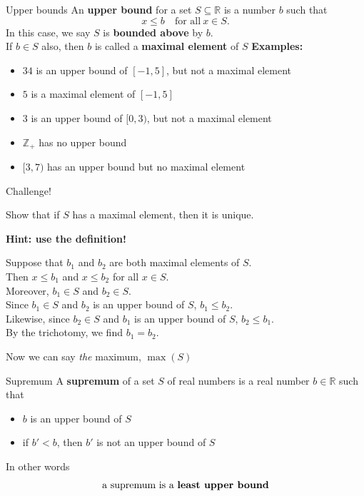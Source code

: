 \documentclass{beamer}
\begin{document}
\begin{frame}{Upper bounds}
An \textbf{upper bound} for a set $S\subseteq\mathbb{R}$ is a number $b$ such that
$$x \leq b\quad\text{for all}\ x\in S.$$
\pause
In this case, we say $S$ is \textbf{bounded above} by $b$.\\
\pause
If $b\in S$ also, then $b$ is called a \textbf{maximal element} of $S$
\pause
\textbf{Examples:}
\begin{itemize}
\pause
\item $34$ is an upper bound of $[-1,5]$, but not a maximal element
\pause
\item $5$ is a maximal element of $[-1,5]$
\pause
\item $3$ is an upper bound of $[0,3)$, but not a maximal element
\pause
\item $\mathbb{Z}_+$ has no upper bound
\pause
\item $[3,7)$ has an upper bound but no maximal element
\end{itemize}
\end{frame}


\begin{frame}{Challenge!}
\begin{prob}
Show that if $S$ has a maximal element, then it is unique.
\end{prob}
\pause
\textbf{Hint: use the definition!}
\pause
\begin{soln}
Suppose that $b_1$ and $b_2$ are both maximal elements of $S$.\\
\pause
Then $x\leq b_1$ and $x\leq b_2$ for all $x\in S$.\\
\pause
Moreover, $b_1\in S$ and $b_2\in S$.\\
\pause
Since $b_1\in S$ and $b_2$ is an upper bound of $S$, $b_1\leq b_2$.\\
\pause
Likewise, since $b_2\in S$ and $b_1$ is an upper bound of $S$, $b_2\leq b_1$.\\
\pause
By the trichotomy, we find $b_1=b_2$.
\end{soln}
\pause
Now we can say \emph{the} maximum, $\max(S)$
\end{frame}

\begin{frame}{Supremum}
A \textbf{supremum} of a set $S$ of real numbers is a real number $b\in\mathbb{R}$ such that
\begin{itemize}
\item $b$ is an upper bound of $S$
\item if $b'<b$, then $b'$ is not an upper bound of $S$
\end{itemize}
\pause
In other words
$$\text{a supremum is a \bf{least upper bound}}$$
\end{frame}
\end{document}
